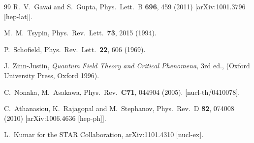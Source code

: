 \documentclass[prl,twocolumn,nofootinbib]{revtex4}
\begin{document}
\begin{thebibliography}{99}
  R.~V.~Gavai and S.~Gupta,
  Phys.\ Lett.\  B {\bf 696}, 459 (2011)
  [arXiv:1001.3796 [hep-lat]].

  M.~M.~Tsypin,
  Phys.\ Rev.\ Lett.\  {\bf 73}, 2015 (1994).

  P.~Schofield,
  Phys.\ Rev.\ Lett.\  {\bf 22}, 606 (1969).
  
  J.~Zinn-Justin, {\em Quantum Field Theory and Critical Phenomena,} 3rd ed.,
  (Oxford University Press, Oxford 1996).

  C.~Nonaka, M.~Asakawa,
  Phys.\ Rev.\  {\bf C71}, 044904 (2005).
  [nucl-th/0410078].

  C.~Athanasiou, K.~Rajagopal and M.~Stephanov,
  Phys.\ Rev.\  D {\bf 82}, 074008 (2010)
  [arXiv:1006.4636 [hep-ph]].

  L.~Kumar for the STAR Collaboration,
  arXiv:1101.4310 [nucl-ex].

\end{thebibliography}
\end{document}
